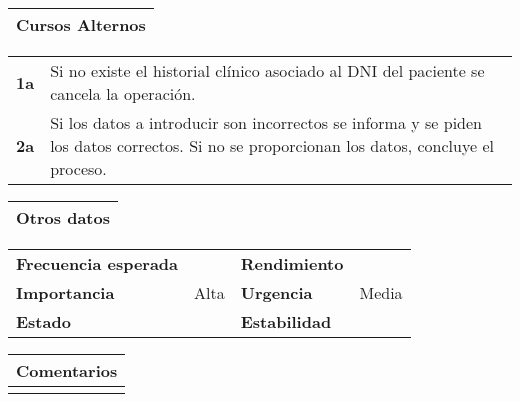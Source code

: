 \documentclass[11pt,a4paper]{article}
\begin{document}
\begin{table}[H]
	\begin{tabularx}{\textwidth}{X}
		\textbf{Cursos Alternos}\\ \hline
	\end{tabularx}
	\begin{tabularx}{\textwidth}{cX}
		\textbf{1a} & Si no existe el historial clínico asociado al DNI del paciente se cancela la operación.\\
		\textbf{2a} & Si los datos a introducir son incorrectos se informa y se piden los datos correctos. Si no se proporcionan los datos, concluye el proceso. \\
	\end{tabularx}
\end{table}

\begin{table}[H]
	\begin{tabularx}{\textwidth}{X}
		\textbf{Otros datos}\\ \hline
	\end{tabularx}
	\begin{tabularx}{\textwidth}{lXlX}
		\textbf{Frecuencia esperada} &  & \textbf{Rendimiento} & \\
		\textbf{Importancia} & Alta & \textbf{Urgencia} & Media \\
		\textbf{Estado} &  & \textbf{Estabilidad} & \\
	\end{tabularx}
	
	\bigskip
	
	\begin{tabularx}{\textwidth}{X}
		\textbf{Comentarios}\\ \hline
		[...] \\
	\end{tabularx}
\end{table}

\newpage




\end{document}
